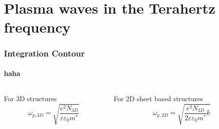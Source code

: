 \documentclass[mathserif,18pt,xcolor=table]{beamer}
\begin{document}
      \section{Plasma waves in the Terahertz frequency}
      \begin{frame}
        \frametitle{Integration Contour}
        \framesubtitle{haha}  %
        \begin{columns} %
          \begin{column}{.5\textwidth}
            For 3D structures
            \begin{equation} \label{N_3d}
              \omega _{p,3D} = \sqrt {\dfrac {e^{2}N_{3D}} {\varepsilon \varepsilon _{0}m^{\ast }}}
            \end{equation}
            \end{column}%
            \hfill%

            \begin{column}{.5\textwidth}
              For 2D sheet based structures
              \begin{equation} \label{N_2d}
                \omega_{p,2D}=\sqrt {\dfrac {e^{2}N_{2D}} {2\varepsilon \varepsilon _{0}m^{\ast }}k}
              \end{equation}
              \end{column}%
            \end{columns}
          \end{frame}
\end{document}
